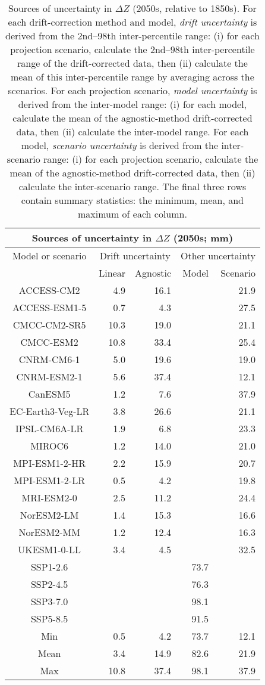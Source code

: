 \begin{table*}[t]
\centering
\caption{Sources of uncertainty in $\Delta Z$ (2050s, relative to 1850s). For each drift-correction method and model, \emph{drift uncertainty} is derived from the 2nd--98th inter-percentile range: (i) for each projection scenario, calculate the 2nd--98th inter-percentile range of the drift-corrected data, then (ii) calculate the mean of this inter-percentile range by averaging across the scenarios. For each projection scenario, \emph{model uncertainty} is derived from the inter-model range: (i) for each model, calculate the mean of the agnostic-method drift-corrected data, then (ii) calculate the inter-model range. For each model, \emph{scenario uncertainty} is derived from the inter-scenario range: (i) for each projection scenario, calculate the mean of the agnostic-method drift-corrected data, then (ii) calculate the inter-scenario range. The final three rows contain summary statistics: the minimum, mean, and maximum of each column.}
\begin{tabular}{c|rr|rr}
\toprule
\multicolumn{5}{c}{Sources of uncertainty in $\Delta Z$ (2050s; mm)} \\ 
\midrule
Model or scenario & \multicolumn{2}{c|}{Drift uncertainty} & \multicolumn{2}{c}{Other uncertainty} \\
 & Linear & Agnostic & Model & Scenario \\
\midrule
ACCESS-CM2 & 4.9 & 16.1 &  & 21.9 \\
ACCESS-ESM1-5 & 0.7 & 4.3 &  & 27.5 \\
CMCC-CM2-SR5 & 10.3 & 19.0 &  & 21.1 \\
CMCC-ESM2 & 10.8 & 33.4 &  & 25.4 \\
CNRM-CM6-1 & 5.0 & 19.6 &  & 19.0 \\
CNRM-ESM2-1 & 5.6 & 37.4 &  & 12.1 \\
CanESM5 & 1.2 & 7.6 &  & 37.9 \\
EC-Earth3-Veg-LR & 3.8 & 26.6 &  & 21.1 \\
IPSL-CM6A-LR & 1.9 & 6.8 &  & 23.3 \\
MIROC6 & 1.2 & 14.0 &  & 21.0 \\
MPI-ESM1-2-HR & 2.2 & 15.9 &  & 20.7 \\
MPI-ESM1-2-LR & 0.5 & 4.2 &  & 19.8 \\
MRI-ESM2-0 & 2.5 & 11.2 &  & 24.4 \\
NorESM2-LM & 1.4 & 15.3 &  & 16.6 \\
NorESM2-MM & 1.2 & 12.4 &  & 16.3 \\
UKESM1-0-LL & 3.4 & 4.5 &  & 32.5 \\
SSP1-2.6 &  &  & 73.7 &  \\
SSP2-4.5 &  &  & 76.3 &  \\
SSP3-7.0 &  &  & 98.1 &  \\
SSP5-8.5 &  &  & 91.5 &  \\
\midrule
Min & 0.5 & 4.2 & 73.7 & 12.1 \\
Mean & 3.4 & 14.9 & 82.6 & 21.9 \\
Max & 10.8 & 37.4 & 98.1 & 37.9 \\
\bottomrule
\end{tabular}
\end{table*}
